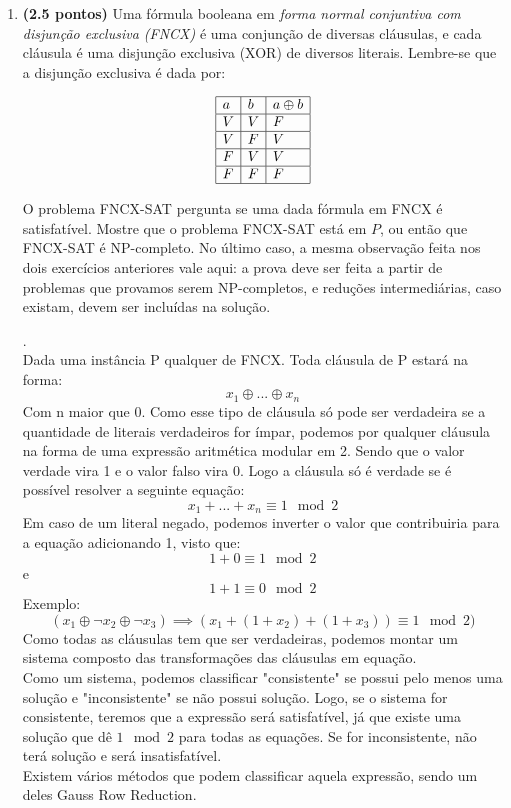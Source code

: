 \documentclass[12pt]{article}
\newcommand{\resposta}[1]{ \noindent {\bf Solução}.{\color{blue} #1}}
\begin{document}
\begin{enumerate}
{    Terceiro, vamos mostrar que a versão simplificada só tem solução se e somente se a versão original tem solução.
    
    Considere um grafo G...
  }
 
\newpage
\item {\bf (2.5 pontos)} Uma fórmula booleana em {\it forma normal conjuntiva com disjunção exclusiva (FNCX)} é uma conjunção de diversas cláusulas, e cada cláusula é uma disjunção exclusiva (XOR) de diversos literais. Lembre-se que a disjunção exclusiva é dada por:

  $$\begin{array}{|l|l|l|}\hline
      a & b & a \oplus b \\ \hline
      V & V & F \\ \hline
      V & F & V \\ \hline
      F & V & V \\ \hline
      F & F & F \\ \hline
  \end{array}$$

  O problema FNCX-SAT pergunta se uma dada fórmula em FNCX é
  satisfatível. Mostre que o problema FNCX-SAT está em $P$, ou então
  que FNCX-SAT é NP-completo. No último caso, a mesma observação feita
  nos dois exercícios anteriores vale aqui: a prova deve ser feita a
  partir de problemas que provamos serem NP-completos, e reduções
  intermediárias, caso existam, devem ser incluídas na solução.

  \resposta{
    \\Dada uma instância P qualquer de FNCX. Toda cláusula de P estará na forma:
        $$x_1 \oplus ... \oplus x_n$$ 
    Com n maior que 0. Como esse tipo de cláusula só pode ser verdadeira se a quantidade de literais verdadeiros for ímpar, podemos por qualquer cláusula na forma de uma expressão aritmética modular em 2. Sendo que o valor verdade vira 1 e o valor falso vira 0. Logo a cláusula só é verdade se é possível resolver a seguinte equação: 
        $$x_1 + ... + x_n \equiv  1 \mod 2$$
    Em caso de um literal negado, podemos inverter o valor que contribuiria para a equação adicionando 1, visto que:
        $$1+0 \equiv 1  \mod 2$$ e $$1 + 1 \equiv 0 \mod 2$$
    Exemplo: 
        $$(x_1 \oplus \neg x_2 \oplus \neg x_3) \implies (x_1 + (1 + x_2) + (1 + x_3)) \equiv 1 \mod 2)$$
    Como todas as cláusulas tem que ser verdadeiras, podemos montar um sistema composto das transformações das cláusulas em equação.\\
    Como um sistema, podemos classificar "consistente" se possui pelo menos uma solução e "inconsistente" se não possui solução. Logo, se o sistema for consistente, teremos que a expressão será satisfatível, já que existe uma solução que dê $1 \mod 2$ para todas as equações. Se for inconsistente, não terá solução e será insatisfatível.\\ Existem vários métodos que podem classificar aquela expressão, sendo um deles Gauss Row Reduction.
  }
\end{enumerate}
\end{document}
